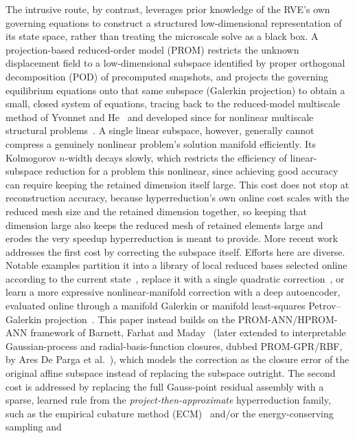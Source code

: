 \documentclass[10pt,a4paper]{article}
\begin{document}
The intrusive route, by contrast, leverages prior knowledge of the
RVE's own governing equations to construct a structured
low-dimensional representation of its state space, rather than
treating the microscale solve as a black box. A projection-based
reduced-order model (PROM) restricts the unknown displacement field to
a low-dimensional subspace identified by proper orthogonal
decomposition (POD) of precomputed snapshots, and projects the
governing equilibrium equations onto that same subspace (Galerkin
projection) to obtain a small, closed system of equations, tracing
back to the reduced-model multiscale method of Yvonnet and
He~\cite{Yvonnet2007} and developed since for nonlinear multiscale
structural problems~\cite{Zahr2017,He2020,Fritzen2016,Hernandez2014,Hernandez2020}.
A single linear subspace, however, generally cannot compress a
genuinely nonlinear problem's solution manifold efficiently. Its
Kolmogorov $n$-width decays slowly, which restricts the efficiency of
linear-subspace reduction for a problem this nonlinear, since
achieving good accuracy can require keeping the retained dimension
itself large. This cost does not stop at
reconstruction accuracy, because hyperreduction's own online cost
scales with the reduced mesh size and the retained dimension together,
so keeping that dimension large also keeps the reduced mesh of
retained elements large and erodes the very speedup hyperreduction is
meant to provide. More recent work addresses the first cost by
correcting the subspace itself. Efforts here are diverse. Notable
examples partition it into a library of local
reduced bases selected online according to the current
state~\cite{Amsallem2012}, replace it with a single quadratic
correction~\cite{Barnett2022}, or learn a more expressive
nonlinear-manifold correction with a deep autoencoder, evaluated
online through a manifold Galerkin or manifold least-squares
Petrov--Galerkin projection~\cite{Lee2020,Romor2025}. This paper
instead builds on the PROM-ANN/HPROM-ANN framework of Barnett, Farhat
and Maday~\cite{Barnett2023} (later extended to interpretable
Gaussian-process and radial-basis-function closures, dubbed
PROM-GPR/RBF, by Ares De Parga et al.~\cite{AresDeParga2026}), which
models the correction as the
closure error of the original affine subspace instead of replacing the
subspace outright. The second cost is
addressed by replacing the full Gauss-point residual assembly with a
sparse, learned rule from the \emph{project-then-approximate}
hyperreduction family, such as the empirical cubature method
(ECM)~\cite{Hernandez2017} and/or the energy-conserving sampling and
\end{document}
